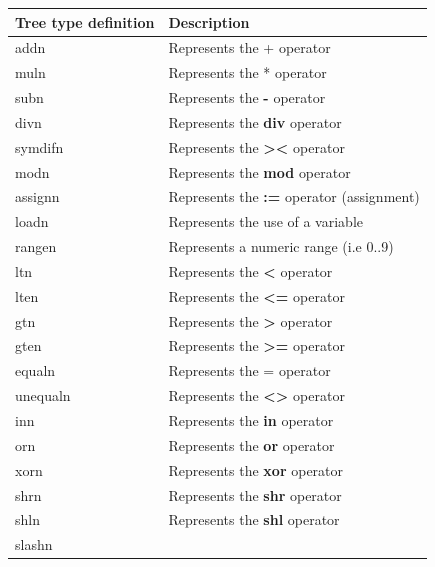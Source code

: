 \documentclass [12pt]{article}
\begin{document}
\begin{longtable}{|l|p{10cm}|}
\hline
Tree type definition& 
Description \\
\hline
\endhead
\hline
\endfoot
\textsf{addn}& 
		\textsf{Represents the + operator} \\
\textsf{muln}& 
		\textsf{Represents the * operator} \\
\textsf{subn}& 
		\textsf{Represents the }\textsf{\textbf{-}}\textsf{ operator} \\
\textsf{divn}& 
		\textsf{Represents the }\textsf{\textbf{div}}\textsf{ operator} \\
\textsf{symdifn}& 
		\textsf{Represents the }\textsf{\textbf{><}}\textsf{ operator} \\
\textsf{modn}& 
		\textsf{Represents the }\textsf{\textbf{mod}}\textsf{ operator} \\
\textsf{assignn}& 
		\textsf{Represents the }\textsf{\textbf{:=}}\textsf{ operator (assignment)} \\
\textsf{loadn}& 
		\textsf{Represents the use of a variable} \\
\textsf{rangen}& 
		\textsf{Represents a numeric range (i.e 0..9)} \\
\textsf{ltn}& 
		\textsf{Represents the }\textsf{\textbf{<}}\textsf{ operator} \\
\textsf{lten}& 
		\textsf{Represents the }\textsf{\textbf{<=}}\textsf{ operator} \\
\textsf{gtn}& 
		\textsf{Represents the }\textsf{\textbf{>}}\textsf{ operator} \\
\textsf{gten}& 
		\textsf{Represents the }\textsf{\textbf{>=}}\textsf{ operator} \\
\textsf{equaln}& 	
		\textsf{Represents the = operator} \\
\textsf{unequaln}& 
		\textsf{Represents the }\textsf{\textbf{<>}}\textsf{ operator} \\
\textsf{inn}& 
		\textsf{Represents the }\textsf{\textbf{in}}\textsf{ operator} \\
\textsf{orn}& 
		\textsf{Represents the }\textsf{\textbf{or}}\textsf{ operator} \\
\textsf{xorn}& 
		\textsf{Represents the }\textsf{\textbf{xor}}\textsf{ operator} \\
\textsf{shrn}& 
		\textsf{Represents the }\textsf{\textbf{shr}}\textsf{ operator} \\
\textsf{shln}& 
		\textsf{Represents the }\textsf{\textbf{shl}}\textsf{ operator} \\
\textsf{slashn}& 

\end{longtable}
\end{document}
